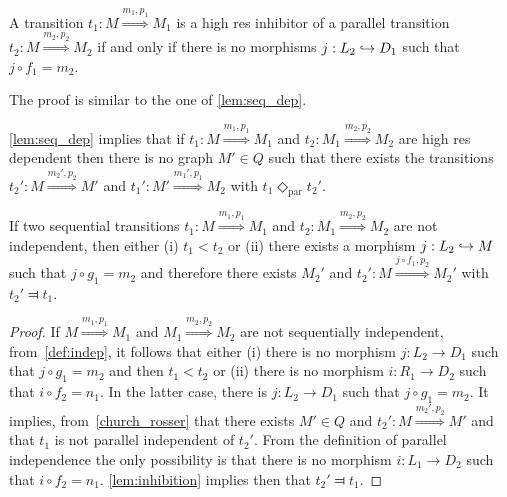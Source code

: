 \begin{lemma}
  \label{lem:inhibition}
  A transition $t_1:M\overset{m_1,p_1}{\Rightarrow} M_1$ is a high res inhibitor of a parallel transition $t_2:M\overset{m_2,p_2}{\Rightarrow} M_2$ if and only if there is no morphisms $j:L_2\hookrightarrow D_1$ such that $j\circ f_1= m_2$.
\end{lemma}
The proof is similar to the one of \autoref{lem:seq_dep}.

\autoref{lem:seq_dep} implies that if $t_1:M\overset{m_1,p_1}{\Rightarrow} M_1$ and $t_2:M_1\overset{m_2,p_2}{\Rightarrow} M_2$ are high res dependent then there is no graph $M'\in Q$ such that there exists the transitions
$t_2':M\overset{m_2',p_2}{\Rightarrow} M'$ and $t_1':M'\overset{m_1',p_1}{\Rightarrow} M_2$ with $t_1\Diamond_{\text{par}}t_2'$.

\begin{lemma}
  \label{lem:not_seq_ind}
  If two sequential transitions $t_1:M\overset{m_1,p_1}{\Rightarrow} M_1$ and $t_2: M_1\overset{m_2,p_2}{\Rightarrow} M_2$ are not independent, then either (i) $t_1 < t_2$ or (ii) there exists a morphism $j:L_2 \hookrightarrow M$ such that $j\circ g_1 = m_2$ and therefore there exists $M_2'$ and $t_2':M\overset{j\circ f_1,p_2}{\Rightarrow} M_2'$ with $t_2'\Dashv t_1$.
\end{lemma}
\begin{proof}
  If $M\overset{m_1,p_1}{\Rightarrow} M_1$ and $M_1\overset{m_2,p_2}{\Rightarrow} M_2$ are not sequentially independent, from~\autoref{def:indep}, it follows that either (i) there is no morphism $j:L_2\to D_1$ such that $j\circ g_1= m_2$ and then $t_1 < t_2$ or
(ii) there is no morphism $i:R_1\to D_2$ such that $i\circ f_2= n_1$. In the latter case, there is $j:L_2\to D_1$ such that $j\circ g_1= m_2$. It implies, from~\autoref{church_rosser} that there exists $M'\in Q$ and $t_2':M\overset{m_2',p_2}{\Rightarrow} M'$ and that $t_1$ is not parallel independent of $t_2'$. From the definition of parallel independence the only possibility is that there is no morphism $i:L_1\to D_2$ such that $i\circ f_2= n_1$. \autoref{lem:inhibition} implies then that $t_2'\Dashv t_1$.
\end{proof}

